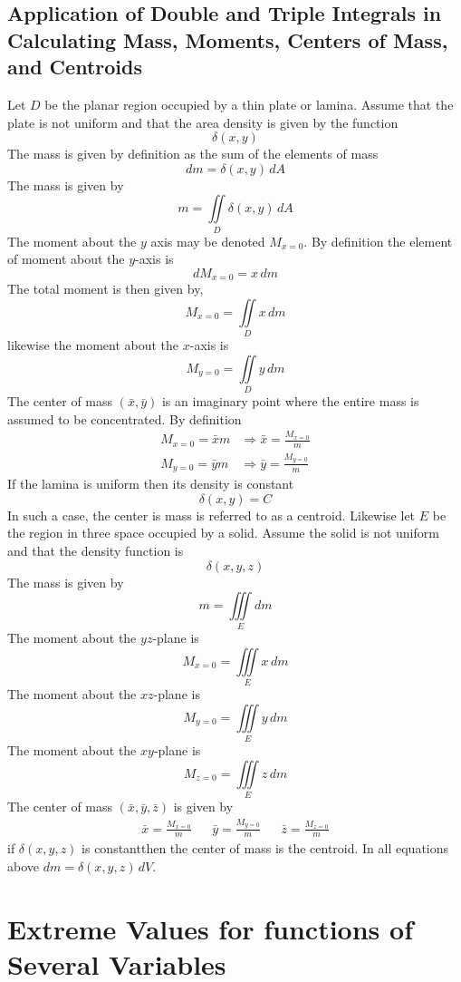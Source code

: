 \documentclass[14pt]{article}
\begin{document}
    \subsection{Application of Double and Triple Integrals in Calculating Mass, Moments, Centers of Mass, and Centroids}
    Let $D$ be the planar region occupied by a thin plate or lamina. Assume that the plate is not uniform and that the area density is given by the function
    $$\delta(x,y)$$
    The mass is given by definition as the sum of the elements of mass
    $$dm=\delta(x,y)\, dA$$
    The mass is given by 
    $$m=\iint\limits_D\delta(x,y)\, dA$$
    The moment about the $y$ axis may be denoted $M_{x=0}$. By definition the element of moment about the $y$-axis is
    $$dM_{x=0}=x\, dm$$
    The total moment is then given by,
    $$M_{x=0}=\iint\limits_D x\, dm$$
    likewise the moment about the $x$-axis is 
    $$M_{y=0}=\iint\limits_D y\, dm$$
    The center of mass $(\bar x, \bar y)$ is an imaginary point where the entire mass is assumed to be concentrated. By definition
    \begin{align*}
        M_{x=0}=\bar x m&\Rightarrow\bar x=\frac{M_{x=0}}{m}\\
        M_{y=0}=\bar y m&\Rightarrow\bar y=\frac{M_{y=0}}{m}
    \end{align*} 
    If the lamina is uniform then its density is constant\footnotemark[2]
    $$\delta(x,y)=C$$
    In such a case, the center is mass is referred to as a centroid. Likewise let $E$ be the region in three space occupied by a solid. Assume the solid is not uniform and that the density function is
    $$\delta(x,y,z)$$
    The mass is given by
    $$m=\iiint\limits_E dm$$
    The moment about the $yz$-plane is
    $$M_{x=0}=\iiint\limits_E x\, dm$$
    The moment about the $xz$-plane is
    $$M_{y=0}=\iiint\limits_E y\, dm$$
    The moment about the $xy$-plane is
    $$M_{z=0}=\iiint\limits_E z\, dm$$
    The center of mass $(\bar x, \bar y, \bar z)$ is given by
    \begin{align*}
        \bar x=\frac{M_{x=0}}{m}&&\bar y=\frac{M_{y=0}}{m}&&\bar z=\frac{M_{z=0}}{m}
    \end{align*}
    if $\delta(x,y,z)$ is constant\footnotemark[2] then the center of mass is the centroid. In all equations above $dm=\delta(x,y,z)\, dV$. 
    \section{Extreme Values for functions of Several Variables}
\end{document}

